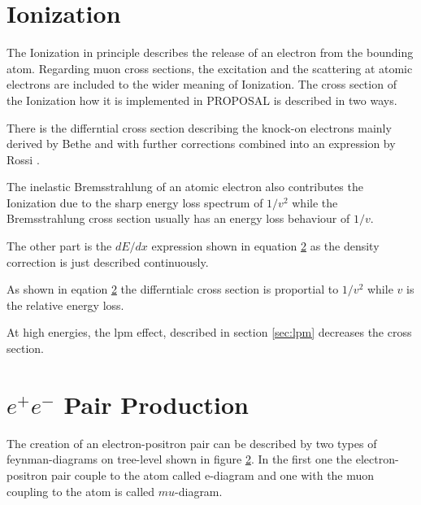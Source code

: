 \section{Ionization}

The Ionization in principle describes the release of an electron from the bounding atom.
Regarding muon cross sections, the excitation and the scattering at atomic electrons are included to the wider meaning of Ionization.
The cross section of the Ionization how it is implemented in PROPOSAL is described in two ways.

There is the differntial cross section describing the knock-on electrons mainly derived by Bethe \cite{Bethe} and with further corrections combined into an expression by Rossi \cite{Rossi}.

The inelastic Bremsstrahlung of an atomic electron also contributes the Ionization due to the sharp energy loss spectrum of $1/v^2$ while the Bremsstrahlung cross section usually has an energy loss behaviour of $1/v$.

The other part is the $dE/dx$ expression shown in equation \ref{} as the density correction is just described continuously.

As shown in eqation \ref{} the differntialc cross section is proportial to $1/v^2$ while $v$ is the relative energy loss.

At high energies, the lpm effect, described in section \ref{sec:lpm} decreases the cross section.

\section{$e^+e^-$ Pair Production}

The creation of an electron-positron pair can be described by two types of feynman-diagrams on tree-level shown in figure \ref{}.
In the first one the electron-positron pair couple to the atom called e-diagram and one with the muon coupling to the atom is called $mu$-diagram.
%         
%         

